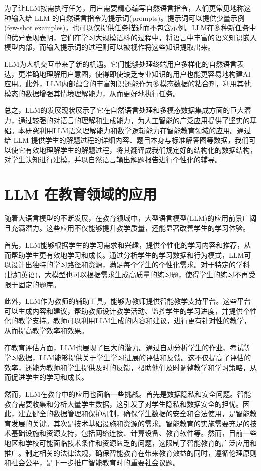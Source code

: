 为了让LLM按需执行任务，用户需要精心编写自然语言指令，人们更常见地称这种输入给 LLM 的自然语言指令为提示词(prompts)。提示词可以提供少量示例(few-shot examples)，也可以仅提供任务描述而不包含示例。LLM在多种新任务中的优异表现表明，它们在学习大规模语料的过程中，将语言中丰富的语义知识嵌入模型内部，而输入提示词的过程则可以被视作将这些知识提取出来。

LLM为人机交互带来了新的机遇\cite{bommasani2021opportunities}。它们能够处理终端用户多样化的自然语言表达，更准确地理解用户意图，使得即使缺乏专业知识的用户也能更容易地构建AI应用。此外，LLM内部蕴含的丰富知识还能作为多模态数据的粘合剂，利用其他模态的数据增强其情境理解能力，从而更好地执行任务。

总之，LLM的发展现状展示了它在自然语言处理和多模态数据集成方面的巨大潜力，通过较强的对语言的理解和生成能力，为人工智能的广泛应用提供了坚实的基础。本研究利用LLM语义理解能力和数学逻辑能力在智能教育领域的应用。通过给 LLM 提供学生的解题过程的详细内容、题目本身与标准解答图等数据，我们可以使它有效地理解学生的解题过程，将其翻译成我们规定好的结构化的数据结构，对学生认知进行建模，并以自然语言输出解题报告进行个性化的辅导。

\section{LLM 在教育领域的应用}

随着大语言模型的不断发展，在教育领域中，大型语言模型(LLM)的应用前景广阔且充满潜力\cite{gan2023large}。这些应用不仅能够提升教学质量，还能显著改善学生的学习体验。

首先，LLM能够根据学生的学习需求和兴趣，提供个性化的学习内容和推荐，从而帮助学生更有效地学习和成长。通过分析学生的学习数据和行为模式，LLM可以设计出独特的学习路径和资源，满足每个学生的个性化需求。对于特定的学科(比如英语)，大模型也可以根据需求生成高质量的练习题，使得学生的练习不再受限于固定的题库。

此外，LLM作为教师的辅助工具，能够为教师提供智能教学支持平台。这些平台可以生成内容和建议，帮助教师设计教学活动、监控学生的学习进度，并提供个性化的教学支持。教师可以利用LLM生成的内容和建议，进行更有针对性的教学，从而提高教学效率和效果。

在教育评估方面，LLM也展现了巨大的潜力。通过自动分析学生的作业、考试等学习数据，LLM能够提供关于学生学习进展的评估和反馈。这不仅提高了评估的效率，还能为教师和学生提供及时的反馈，帮助他们及时调整教学和学习策略，从而促进学生的学习和成长。

然而，LLM在教育中的应用也面临一些挑战。首先是数据隐私和安全问题。智能教育需要收集和分析大量学生数据，这引发了对学生隐私和数据安全的担忧。因此，建立健全的数据管理和保护机制，确保学生数据的安全和合法使用，是智能教育发展的关键。其次是技术基础设施和资源的需求。智能教育的实施需要充足的技术基础设施和资源支持，包括网络连接、计算设备、教育软件等。然而，目前一些地区和学校可能面临技术条件和资源匮乏的问题，这限制了智能教育的广泛应用和推广。制定相关的法律法规，确保智能教育在带来教育效益的同时，遵循伦理原则和社会公平，是下一步推广智能教育时的重要社会议题。